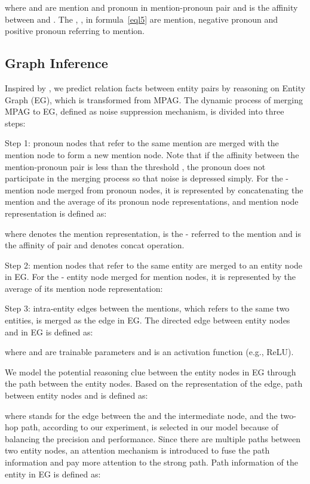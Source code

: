 \documentclass{article}
\begin{document}
where  and  are mention and pronoun in mention-pronoun pair  and  is the affinity between  and . The , ,  in formula~\ref{eql5} are mention, negative pronoun and positive pronoun referring to mention.

\subsection{Graph Inference}

Inspired by \cite{zeng2020double}, we predict relation facts between entity pairs by reasoning on Entity Graph (EG), which is transformed from MPAG. The dynamic process of merging MPAG to EG, defined as noise suppression mechanism, is divided into three steps: 

Step 1: pronoun nodes that refer to the same mention are merged with the mention node to form a new mention node. Note that if the affinity between the mention-pronoun pair is less than the threshold , the pronoun does not participate in the merging process so that noise is depressed simply. For the 
- mention node merged from  pronoun nodes, it is represented by concatenating the mention and the average of its  pronoun node representations, and mention node representation is defined as:



where  denotes the mention representation,  is the - referred to the mention  and  is the affinity of  pair and  denotes concat operation.

Step 2: mention nodes that refer to the same entity are merged to an entity node in EG. For the - entity node merged for  mention nodes, it is represented by the average of its  mention node representation:



Step 3: intra-entity edges between the mentions, which refers to the same two entities, is merged as the edge in EG. The directed edge between entity nodes  and  in EG is defined as:



where  and  are trainable parameters and  is an activation function (e.g., ReLU).

We model the potential reasoning clue between the entity nodes in EG through the path between the entity nodes. Based on the representation of the edge,  path between entity nodes  and  is defined as: 



where  stands for the edge between the  and the  intermediate node, and the two-hop path, according to our experiment, is selected in our model because of balancing the precision and performance. Since there are multiple paths between two entity nodes, an attention mechanism is introduced to fuse the path information and pay more attention to the strong path. Path information of the entity in EG is defined as:
\end{document}
